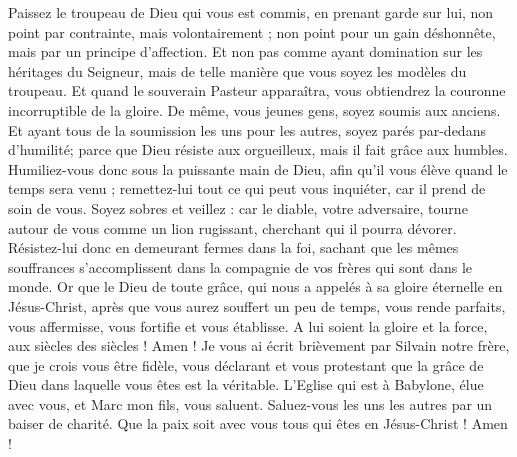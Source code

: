 \begin{multicols}{2}
Paissez le troupeau de Dieu qui vous est commis, en prenant garde sur lui, non point par contrainte, mais volontairement ; non point pour un gain déshonnête, mais par un principe d'affection. 
Et non pas comme ayant domination sur les héritages du Seigneur, mais de telle manière que vous soyez les modèles du troupeau. 
Et quand le souverain Pasteur apparaîtra, vous obtiendrez la couronne incorruptible de la gloire.
De même, vous jeunes gens, soyez soumis aux anciens. Et ayant tous de la soumission les uns pour les autres, soyez parés par-dedans d'humilité; parce que Dieu résiste aux orgueilleux, mais il fait grâce aux humbles. 
Humiliez-vous donc sous la puissante main de Dieu, afin qu'il vous élève quand le temps sera venu ;
remettez-lui tout ce qui peut vous inquiéter, car il prend de soin de vous.
Soyez sobres et veillez : car le diable, votre adversaire, tourne autour de vous comme un lion rugissant, cherchant qui il pourra dévorer. 
Résistez-lui donc en demeurant fermes dans la foi, sachant que les mêmes souffrances s'accomplissent dans la compagnie de vos frères qui sont dans le monde. 
Or que le Dieu de toute grâce, qui nous a appelés à sa gloire éternelle en Jésus-Christ, après que vous aurez souffert un peu de temps, vous rende parfaits, vous affermisse, vous fortifie et vous établisse. 
A lui soient la gloire et la force, aux siècles des siècles ! Amen !
Je vous ai écrit brièvement par Silvain notre frère, que je crois vous être fidèle, vous déclarant et vous protestant que la grâce de Dieu dans laquelle vous êtes est la véritable. 
L'Eglise qui est à Babylone, élue avec vous, et Marc mon fils, vous saluent. 
Saluez-vous les uns les autres par un baiser de charité. Que la paix soit avec vous tous qui êtes en Jésus-Christ ! Amen !
\PPE{}
\end{multicols}
